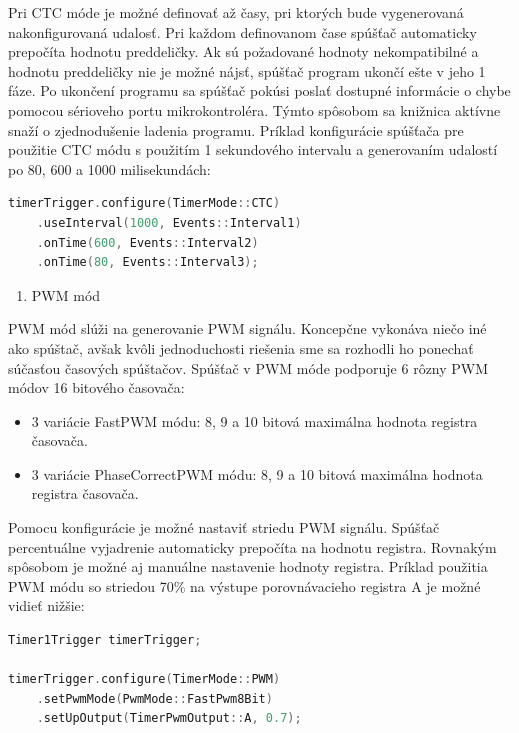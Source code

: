 Pri CTC móde je možné definovať až časy, pri ktorých bude vygenerovaná nakonfigurovaná udalosť. Pri každom definovanom čase spúšťač automaticky prepočíta
hodnotu preddeličky. Ak sú požadované hodnoty nekompatibilné a hodnotu preddeličky nie je možné nájsť, spúšťač program ukončí ešte v jeho 1 fáze. Po ukončení programu
sa spúšťač pokúsi poslať dostupné informácie o chybe pomocou sérioveho portu mikrokontroléra. Týmto spôsobom sa knižnica aktívne snaží o zjednodušenie ladenia programu.
Príklad konfigurácie spúšťača pre použitie CTC módu s použitím 1 sekundového intervalu a generovaním udalostí po 80, 600 a 1000 milisekundách:
\begin{lstlisting}[language=c++]      
timerTrigger.configure(TimerMode::CTC)
    .useInterval(1000, Events::Interval1)
    .onTime(600, Events::Interval2)
    .onTime(80, Events::Interval3);
\end{lstlisting}

\begin{enumerate}[resume]
    \item PWM mód
\end{enumerate}

PWM mód slúži na generovanie PWM signálu. Koncepčne vykonáva niečo iné ako spúštač, avšak kvôli jednoduchosti riešenia sme sa rozhodli ho ponechať súčasťou časových
spúštačov. Spúšťač v PWM móde podporuje 6 rôzny PWM módov 16 bitového časovača:
\begin{itemize}
    \item 3 variácie FastPWM módu: 8, 9 a 10 bitová maximálna hodnota registra časovača.
    \item 3 variácie PhaseCorrectPWM módu: 8, 9 a 10 bitová maximálna hodnota registra časovača.
\end{itemize}

Pomocu konfigurácie je možné nastaviť striedu PWM signálu. Spúšťač percentuálne vyjadrenie automaticky prepočíta na hodnotu registra. Rovnakým spôsobom je možné
aj manuálne nastavenie hodnoty registra. Príklad použitia PWM módu so striedou 70\% na  výstupe porovnávacieho registra A je možné vidieť nižšie:

\begin{lstlisting}[language=c++]      
Timer1Trigger timerTrigger;

timerTrigger.configure(TimerMode::PWM)
    .setPwmMode(PwmMode::FastPwm8Bit)
    .setUpOutput(TimerPwmOutput::A, 0.7);
\end{lstlisting}


